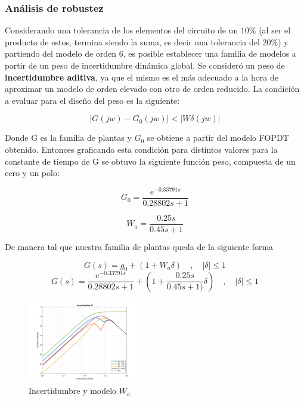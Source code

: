 \documentclass[letterpaper, 10 pt, conference]{ieeeconf}  %
\begin{document}
\subsubsection{Análisis de robustez}

Considerando una tolerancia de los elementos del circuito de un $10\%$ (al ser el producto de estos, termina siendo la suma, es decir una tolerancia del $20\%$) y partiendo del modelo de orden 6, es posible establecer una familia de modelos a partir de un peso de incertidumbre dinámica global. Se consideró un peso de \textbf{incertidumbre aditiva}, ya que el mismo es el más adecuado a la hora de aproximar un modelo de orden elevado con otro de orden reducido. La condición a evaluar para el diseño del peso es la siguiente:

\begin{equation*}
  |G(jw) - G_0(jw)| < |W\delta(jw)|
\end{equation*}

Donde G es la familia de plantas y $G_0$ se obtiene a partir del modelo FOPDT obtenido. Entonces graficando esta condición para distintos valores para la constante de tiempo de G se obtuvo la siguiente función peso, compuesta de un cero y un polo:

\begin{equation*}
  G_0 = \frac{e^{-0.33791s}}{0.28802s+1}
\end{equation*}

\begin{equation*}
  W_a = \frac{0.25s}{0.45s+1}
\end{equation*}

De manera tal que nuestra familia de plantas queda de la siguiente forma

\begin{equation*}
  G(s) = g_0 + (1 + W_{a}\delta)  \hspace{1em},\hspace{1em} |\delta| \leq 1
\end{equation*}
\begin{equation*}
  G(s) = \frac{e^{-0.33791s}}{0.28802s+1} + (1 + \frac{0.25s}{0.45s+1)}\delta) \hspace{1em},\hspace{1em} |\delta| \leq 1
\end{equation*}

\begin{figure}[htpb]
  \centering
  \includegraphics[width=0.43\textwidth]{./IMAGENES/wa.png}
  \caption{Incertidumbre y modelo $W_a$}
  \label{fig:incertidumbres}
\end{figure}
\end{document}
